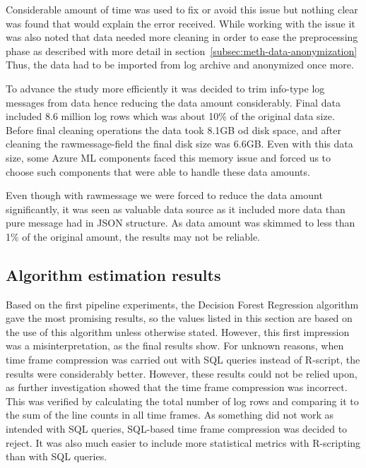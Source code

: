 Considerable amount of time was used
to fix or avoid this issue
but nothing clear was found
that would explain the error received.
While working with the issue
it was also noted
that data needed more cleaning
in order to ease the preprocessing phase
as described with more detail in section~\ref{subsec:meth-data-anonymization}
Thus,
the data had to be imported from log archive
and anonymized once more.

To advance the study more efficiently
it was decided to trim info-type log messages from data
hence reducing the data amount considerably.
Final data included 8.6 million log rows
which was about 10\% of the original data size.
Before final cleaning operations
the data took 8.1GB od disk space,
and after cleaning the rawmessage-field
the final disk size was 6.6GB\@.
Even with this data size,
some Azure ML components faced this memory issue
and forced us to choose such components
that were able to handle these data amounts.


Even though with rawmessage we were forced to reduce the data amount significantly,
it was seen as valuable data source
as it included more data than pure message had in JSON structure.
As data amount was skimmed to less than 1\% of the original amount,
the results may not be reliable.



\subsection{Algorithm estimation results}\label{subsec:res-algorithm-estimation-results}

Based on the first pipeline experiments,
the Decision Forest Regression algorithm gave the most promising results,
so the values listed in this section are based on the use of this algorithm unless otherwise stated.
However, this first impression was a misinterpretation,
as the final results show.
For unknown reasons,
when time frame compression was carried out with SQL queries instead of R-script,
the results were considerably better.
However, these results could not be relied upon,
as further investigation showed that the time frame compression was incorrect.
This was verified by calculating the total number of log rows
and comparing it to the sum of the line counts in all time frames.
As something did not work as intended with SQL queries,
SQL-based time frame compression was decided to reject.
It was also much easier to include more statistical metrics
with R-scripting than with SQL queries.

